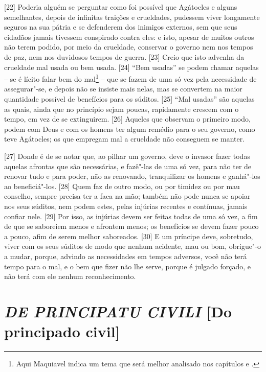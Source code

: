 {[}22{]} Poderia alguém se perguntar como foi possível que Agátocles e
alguns semelhantes, depois de infinitas traições e crueldades, pudessem
viver longamente seguros na sua pátria e se defenderem dos inimigos
externos, sem que seus cidadãos jamais tivessem conspirado contra eles:
e isto, apesar de muitos outros não terem podido, por meio da crueldade,
conservar o governo nem nos tempos de paz, nem nos duvidosos tempos de
guerra. {[}23{]} Creio que isto advenha da crueldade mal usada ou bem
usada. {[}24{]} ``Bem usadas'' se podem chamar aquelas -- se é lícito
falar bem do mal\footnote{Aqui Maquiavel indica um tema que será melhor
  analisado nos capítulos  e .} -- que se fazem de uma só vez pela
necessidade de assegurar"-se, e depois não se insiste mais nelas, mas se
convertem na maior quantidade possível de benefícios para os súditos.
{[}25{]} ``Mal usadas'' são aquelas as quais, ainda que no princípio
sejam poucas, rapidamente crescem com o tempo, em vez de se extinguirem.
{[}26{]} Aqueles que observam o primeiro modo, podem com Deus e com os
homens ter algum remédio para o seu governo, como teve Agátocles; os que
empregam mal a crueldade não conseguem se manter.

{[}27{]} Donde é de se notar que, ao pilhar um governo, deve o invasor
fazer todas aquelas afrontas que são necessárias, e fazê"-las de uma só
vez, para não ter de renovar tudo e para poder, não as renovando,
tranquilizar os homens e ganhá"-los ao beneficiá"-los. {[}28{]} Quem faz
de outro modo, ou por timidez ou por mau conselho, sempre precisa ter a
faca na mão; também não pode nunca se apoiar nos seus súditos, nem podem
estes, pelas injúrias recentes e contínuas, jamais confiar nele.
{[}29{]} Por isso, as injúrias devem ser feitas todas de uma só vez, a
fim de que se saboreiem menos e afrontem menos; os benefícios se devem
fazer pouco a pouco, afim de serem melhor saboreados. {[}30{]} E um
príncipe deve, sobretudo, viver com os seus súditos de modo que nenhum
acidente, mau ou bom, obrigue"-o a mudar, porque, advindo as necessidades
em tempos adversos, você não terá tempo para o mal, e o bem que fizer
não lhe serve, porque é julgado forçado, e não terá com ele nenhum
reconhecimento.

\quebra\section{\emph{DE PRINCIPATU CIVILI}\break
{[}Do principado civil{]}}

